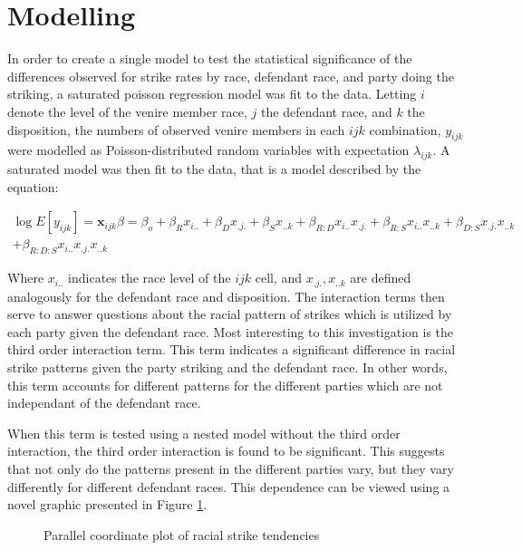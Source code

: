 \section{Modelling} \label{sec:mods}

In order to create a single model to test the statistical significance of the differences observed for strike rates by race,
defendant race, and party doing the striking, a saturated poisson regression model was fit to the data. Letting $i$ denote the
level of the venire member race, $j$ the defendant race, and $k$ the disposition, the numbers of observed venire members in each
$ijk$ combination, $y_{ijk}$ were modelled as Poisson-distributed random variables with expectation $\lambda_{ijk}$. A saturated
model was then fit to the data, that is a model described by the equation:

\begin{multline}
  \log{E[y_{ijk}]} = \textbf{x}_{ijk}\beta = \beta_o + \beta_R x_{i..}  + \beta_{D} x_{.j.} + \beta_S x_{..k} +\beta_{R:D}x_{i..}
  x_{.j.} + \beta_{R:S} x_{i..} x_{..k} +\beta_{D:S} x_{.j.}x_{..k} \\+ \beta_{R:D:S} x_{i..} x_{.j.} x_{..k}
\end{multline}

Where $x_{i..}$ indicates the race level of the $ijk$ cell, and $x_{.j.},x_{..k}$ are defined analogously for the defendant race
and disposition. The interaction terms then serve to answer questions about the racial pattern of strikes which is utilized by
each party given the defendant race. Most interesting to this investigation is the third order interaction term. This term
indicates a significant difference in racial strike patterns given the party striking and the defendant race. In other words, this
term accounts for different patterns for the different parties which are not independant of the defendant race.

When this term is tested using a nested model without the third order interaction, the third order interaction is found to be
significant. This suggests that not only do the patterns present in the different parties vary, but they vary differently for
different defendant races. This dependence can be viewed using a novel graphic presented in Figure \ref{fig:raceraceparcoord}.

\begin{figure}[!h]
  \centering
  \caption[Strike Tendency by Racial Combination {Sunshine}]{Parallel coordinate plot of racial strike tendencies}
  \label{fig:raceraceparcoord}
\end{figure}

